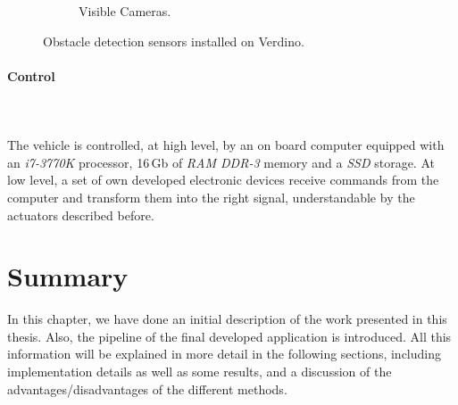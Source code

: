 \begin{figure}[h!]
\begin{subfigure}[b]{0.32\textwidth}
                \caption{Visible Cameras.}\label{fig:cp00_visible_cameras}
        \end{subfigure}%
        \caption{Obstacle detection sensors installed on Verdino.}\label{fig:cp00_actuators}
\end{figure}

\paragraph{Control}\label{ch:chapter00_03_00_00_03}

~\\~\\The vehicle is controlled, at high level, by an on board computer equipped with an \emph{i7-3770K} processor, 16\,Gb of \emph{RAM DDR-3} memory and a \emph{SSD} storage. At low level, a set of own developed electronic devices receive commands from the computer and transform them into the right signal, understandable by the actuators described before.

\section{Summary}\label{ch:chapter00_04}

In this chapter, we have done an initial description of the work presented in this thesis. Also, the pipeline of the final developed application is introduced. All this information will be explained in more detail in the following sections, including implementation details as well as some results, and a discussion of the advantages/disadvantages of the different methods.